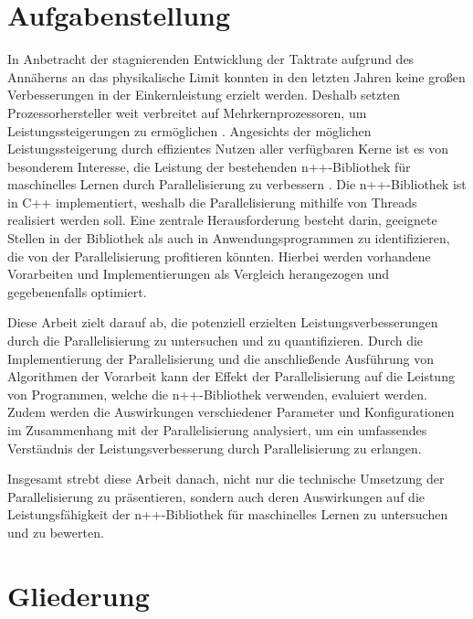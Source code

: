 \section{Aufgabenstellung}
\label{sec:Einleitung_Aufgabenstellung}
In Anbetracht der stagnierenden Entwicklung der Taktrate aufgrund des Annäherns an das physikalische Limit konnten in den letzten Jahren keine großen Verbesserungen in der Einkernleistung erzielt werden. Deshalb setzten Prozessorhersteller weit verbreitet auf Mehrkernprozessoren, um Leistungssteigerungen zu ermöglichen \citep{Chip_makers_turn_to_multicore}. Angesichts der möglichen Leistungssteigerung durch effizientes Nutzen aller verfügbaren Kerne ist es von besonderem Interesse, die Leistung der bestehenden n++-Bibliothek für maschinelles Lernen durch Parallelisierung zu verbessern \citep{Riedmiller_RPROP}. Die n++-Bibliothek ist in C++ implementiert, weshalb die Parallelisierung mithilfe von Threads realisiert werden soll. Eine zentrale Herausforderung besteht darin, geeignete Stellen in der Bibliothek als auch in Anwendungsprogrammen zu identifizieren, die von der Parallelisierung profitieren könnten. Hierbei werden vorhandene Vorarbeiten \citep{thesis_Artur_Brening} und Implementierungen als Vergleich herangezogen und gegebenenfalls optimiert.

Diese Arbeit zielt darauf ab, die potenziell erzielten Leistungsverbesserungen durch die Parallelisierung zu untersuchen und zu quantifizieren. Durch die Implementierung der Parallelisierung und die anschließende Ausführung von Algorithmen der Vorarbeit kann der Effekt der Parallelisierung auf die Leistung von Programmen, welche die n++-Bibliothek verwenden, evaluiert werden. Zudem werden die Auswirkungen verschiedener Parameter und Konfigurationen im Zusammenhang mit der Parallelisierung analysiert, um ein umfassendes Verständnis der Leistungsverbesserung durch Parallelisierung zu erlangen.

Insgesamt strebt diese Arbeit danach, nicht nur die technische Umsetzung der Parallelisierung zu präsentieren, sondern auch deren Auswirkungen auf die Leistungsfähigkeit der n++-Bibliothek für maschinelles Lernen zu untersuchen und zu bewerten.

\section{Gliederung}
\label{sec:Einleitung_Gliederung}



